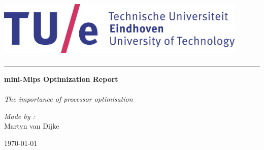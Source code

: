 \documentclass[10pt]{article}
\begin{document}
\begin{titlepage}
    \color[rgb]{.1,.1,1}
    \hspace{5mm}
    \includegraphics[width=12cm,height=3cm]{tue.PNG}

    \bigskip

    \hspace{20mm}
    \begin{minipage}{10mm}
        \color[rgb]{.0,.0,0.0}
        \rule{1pt}{200mm}
    \end{minipage}
    \begin{minipage}{123mm}
        \vspace{10mm}
        \color{black}
        \Huge{\bfseries {mini-Mips Optimization Report }}
        \huge
        \\ \\
        \textit{The importance of processor optimisation }
        \vspace{40mm}

        \Large
        \textit{Made by :}\\
        Martyn van Dijke


        \vspace{20mm}

        \today
        \hspace{30mm} %
        \color[rgb]{.4,.4,1} %
    \end{minipage}
\end{titlepage}

\restoregeometry
\clearpage

\pagestyle{fancy}
\lhead{ \nouppercase \leftmark }
\chead{  }
\rhead{    }
\renewcommand{\headrulewidth}{0.4pt}
\lfoot{}
\cfoot{}

\tableofcontents

\clearpage

\end{document}
